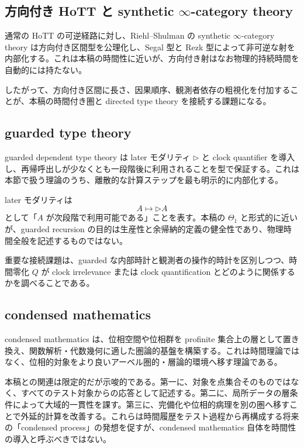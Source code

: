\documentclass[a4paper,11pt]{ltjsarticle}
\theoremstyle{remark}
\begin{document}
\subsection{方向付き HoTT と synthetic $\infty$-category theory}
通常の HoTT の可逆経路に対し、Riehl--Shulman の synthetic $\infty$-category theory は方向付き区間型を公理化し、Segal 型と Rezk 型によって非可逆な射を内部化する\cite{RiehlShulman2017}。これは本稿の時間性に近いが、方向付き射はなお物理的持続時間を自動的には持たない。

したがって、方向付き区間に長さ、因果順序、観測者依存の粗視化を付加することが、本稿の時間付き圏と directed type theory を接続する課題になる。

\subsection{guarded type theory}
guarded dependent type theory は later モダリティ $\triangleright$ と clock quantifier を導入し、再帰呼出しが少なくとも一段階後に利用されることを型で保証する\cite{BizjakEtAl2016}。これは本節で扱う理論のうち、離散的な計算ステップを最も明示的に内部化する。

later モダリティは
\begin{equation}
 A\longmapsto\triangleright A
\end{equation}
として「$A$ が次段階で利用可能である」ことを表す。本稿の $\Theta_1$ と形式的に近いが、guarded recursion の目的は生産性と余帰納的定義の健全性であり、物理時間全般を記述するものではない。

重要な接続課題は、guarded な内部時計と観測者の操作的時計を区別しつつ、時間零化 $Q$ が clock irrelevance または clock quantification とどのように関係するかを調べることである。

\subsection{condensed mathematics}
condensed mathematics は、位相空間や位相群を profinite 集合上の層として置き換え、関数解析・代数幾何に適した圏論的基盤を構築する\cite{Scholze2026}。これは時間理論ではなく、位相的対象をより良いアーベル圏的・層論的環境へ移す理論である。

本稿との関連は限定的だが示唆的である。第一に、対象を点集合そのものではなく、すべてのテスト対象からの応答として記述する。第二に、局所データの層条件によって大域的一貫性を課す。第三に、完備化や位相的病理を別の圏へ移すことで外延的計算を改善する。これらは時間履歴をテスト過程から再構成する将来の「condensed process」の発想を促すが、condensed mathematics 自体を時間性の導入と呼ぶべきではない。
\end{document}
